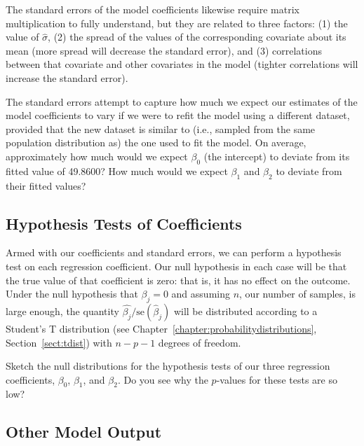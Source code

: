 The standard errors of the model coefficients likewise require matrix multiplication to fully understand, but they are related to three factors: (1) the value of $\hat{\sigma}$, (2) the spread of the values of the corresponding covariate about its mean (more spread will decrease the standard error), and (3) correlations between that covariate and other covariates in the model (tighter correlations will increase the standard error).
\vspace{5mm}

\begin{question}{}
The standard errors attempt to capture how much we expect our estimates of the model coefficients to vary if we were to refit the model using a different dataset, provided that the new dataset is similar to (i.e., sampled from the same population distribution as) the one used to fit the model. On average, approximately how much would we expect $\beta_0$ (the intercept) to deviate from its fitted value of 49.8600? How much would we expect $\beta_1$ and $\beta_2$ to deviate from their fitted values? 
\end{question}

\subsection{Hypothesis Tests of Coefficients}

Armed with our coefficients and standard errors, we can perform a hypothesis test on each regression coefficient. Our null hypothesis in each case will be that the true value of that coefficient is zero: that is, it has no effect on the outcome. Under the null hypothesis that $\beta_j = 0$ and assuming $n$, our number of samples, is large enough, the quantity $\hat{\beta_j}/\text{se}(\hat{\beta}_j)$ will be distributed according to a Student's T distribution (see Chapter~\ref{chapter:probabilitydistributions}, Section~\ref{sect:tdist}) with $n-p-1$ degrees of freedom.
\vspace{5mm}

\begin{question}{}
Sketch the null distributions for the hypothesis tests of our three regression coefficients, $\beta_0$, $\beta_1$, and $\beta_2$. Do you see why the $p$-values for these tests are so low?
\end{question}

\subsection{Other Model Output}

